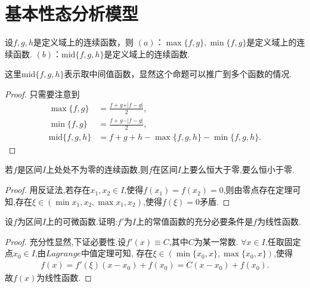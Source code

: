 \documentclass[../../main.tex]{subfiles}
\begin{document}
\section{基本性态分析模型}

\begin{proposition}[多个函数取最值或者中间值]\label{proposition:多个函数取最值或者中间值}
设\(f,g,h\)是定义域上的连续函数，则
\((a)\)：\(\max\{f,g\}, \min\{f,g\}\)是定义域上的连续函数.
\((b)\)：\(\text{mid}\{f,g,h\}\)是定义域上的连续函数.
\end{proposition}
\begin{remark}
这里\(\text{mid}\{f,g,h\}\)表示取中间值函数，显然这个命题可以推广到多个函数的情况.
\end{remark}
\begin{proof}
只需要注意到
\begin{align*}
\max\{f,g\}&=\frac{f + g+\vert f - g\vert}{2},\\
\min\{f,g\}&=\frac{f + g-\vert f - g\vert}{2},\\
\text{mid}\{f,g,h\}&=f + g + h-\max\{f,g,h\}-\min\{f,g,h\}.
\end{align*}
\end{proof}

\begin{proposition}\label{proposition:连续函数无零点则一定恒大于零或恒小于零}
若\(f\)是区间\(I\)上处处不为零的连续函数,则\(f\)在区间\(I\)上要么恒大于零,要么恒小于零.
\end{proposition}
\begin{proof}
用反证法,若存在$x_1,x_2\in I$,使得$f(x_1)=f(x_2)=0$,则由零点存在定理可知,存在$\xi \in (\min{x_1,x_2},\max{x_1,x_2})$,使得$f(\xi)=0$矛盾.
\end{proof}

\begin{proposition}\label{proposition:导数为常数的函数必是线性函数}
设\(f\)为区间\(I\)上的可微函数.证明:\(f'\)为\(I\)上的常值函数的充分必要条件是\(f\)为线性函数.
\end{proposition}
\begin{proof}
充分性显然,下证必要性.设$f'(x)\equiv C$,其中$C$为某一常数.
$\forall x\in I$,任取固定点$x_0\in I$,由$Lagrange$中值定理可知,
存在$\xi\in(\min\{x_0,x\},\max\{x_0,x\})$,使得
\begin{align*}
f(x)=f'(\xi)(x-x_0)+f(x_0)=C(x-x_0)+f(x_0).
\end{align*}
故$f(x)$为线性函数.
\end{proof}
\end{document}
